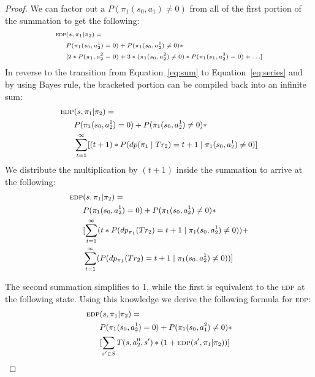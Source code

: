 \documentclass[letterpaper]{article}
\begin{document}
\begin{proof}
\noindent We can factor out a $P(\pi_1(s_0, a_1) \neq 0)$ from all of the first portion of the summation to get the following:
\begin{equation*}
\scriptsize
\begin{split}
\textsc{edp} & (s, \pi_1 | \pi_2) = \\
& P(\pi_1(s_0, a_2^1) = 0) + P(\pi_1(s_0, a_2^1) \neq 0) * \\
& [2*P(\pi_1, a_2^2 = 0) + 3*(\pi_1(s_0, a_2^2) \neq 0)*P(\pi_1(s_1, a_2^3) = 0) + \ldots]
\end{split}
\normalsize
\end{equation*}
In reverse to the transition from Equation~\ref{eq:sum} to Equation~\ref{eq:series} and by using Bayes rule, the bracketed portion can be compiled back into an infinite sum: %
\begin{equation*}
\small
\begin{split}
\textsc{edp} & (s, \pi_1 | \pi_2) = \\
& P(\pi_1(s_0, a^1_2) = 0) + P(\pi_1(s_0, a^1_2) \neq 0) * \\ & \sum\limits_{t=1}^\infty[(t+1) * P(dp(\pi_1 \mid Tr_2) = t+1 \mid \pi_1(s_0, a^1_2) \neq 0)]
\end{split}
\normalsize
\end{equation*}
We distribute the multiplication by $(t+1)$ inside the summation to arrive at the following:
\begin{equation*}
\small
\begin{split}
\textsc{edp} & (s, \pi_1 | \pi_2) = \\
& P(\pi_1(s_0,a_2^1) = 0) + P(\pi_1(s_0, a_2^1) \neq 0) * \\ & [\sum\limits_{t=1}^\infty(t * P(dp_{\pi_1}(Tr_2) = t+1 \mid \pi_1(s_0, a_2^1) \neq 0)) + \\ & \sum\limits_{t=1}^\infty (P(dp_{\pi_1}(Tr_2) = t+1 \mid \pi_1(s_0, a_2^1) \neq 0))]
\end{split}
\normalsize
\end{equation*}

\noindent The second summation simplifies to 1, while the first is equivalent to the \textsc{edp} at the following state. Using this knowledge %
we derive the following formula for \textsc{edp}:
\begin{equation*}
\small
\begin{split}
\textsc{edp} & (s, \pi_1 |  \pi_2) = \\
& P(\pi_1(s_0, a_2^1) = 0) + P(\pi_1(s_0, a^2_1) \neq 0) * \\ &
[\sum\limits_{s'\in S}T(s,a_2^0,s')*(1+\textsc{edp}(s', \pi_1 | \pi_2))]
\end{split}
\normalsize
\end{equation*}


\end{proof}
\end{document}

